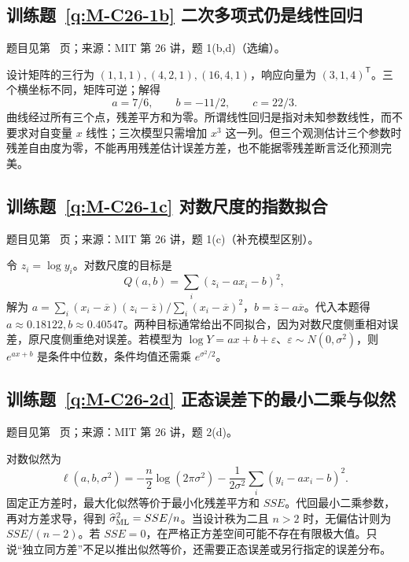 \documentclass[UTF8,12pt,a4paper,fontset=fandol]{ctexbook}
\begin{document}
\subsection*{训练题~\ref{q:M-C26-1b} 二次多项式仍是线性回归}\label{a:M-C26-1b}{\small 题目见第~\pageref{q:M-C26-1b} 页；来源：MIT 第 26 讲，题 1(b,d)（选编）。}
\begin{solve}设计矩阵的三行为 $(1,1,1),(4,2,1),(16,4,1)$，响应向量为 $(3,1,4)^\mathsf T$。三个横坐标不同，矩阵可逆；解得\[a=7/6,\qquad b=-11/2,\qquad c=22/3.\]曲线经过所有三个点，残差平方和为零。所谓线性回归是指对未知参数线性，而不要求对自变量 $x$ 线性；三次模型只需增加 $x^3$ 这一列。但三个观测估计三个参数时残差自由度为零，不能再用残差估计误差方差，也不能据零残差断言泛化预测完美。\end{solve}

\subsection*{训练题~\ref{q:M-C26-1c} 对数尺度的指数拟合}\label{a:M-C26-1c}{\small 题目见第~\pageref{q:M-C26-1c} 页；来源：MIT 第 26 讲，题 1(c)（补充模型区别）。}
\begin{solve}令 $z_i=\log y_i$。对数尺度的目标是\[Q(a,b)=\sum_i(z_i-ax_i-b)^2,\]解为 $a=\sum_i(x_i-\overline x)(z_i-\overline z)/\sum_i(x_i-\overline x)^2$，$b=\overline z-a\overline x$。代入本题得 $a\approx0.18122,b\approx0.40547$。两种目标通常给出不同拟合，因为对数尺度侧重相对误差，原尺度侧重绝对误差。若模型为 $\log Y=ax+b+\varepsilon$、$\varepsilon\sim N(0,\sigma^2)$，则 $e^{ax+b}$ 是条件中位数，条件均值还需乘 $e^{\sigma^2/2}$。\end{solve}

\subsection*{训练题~\ref{q:M-C26-2d} 正态误差下的最小二乘与似然}\label{a:M-C26-2d}{\small 题目见第~\pageref{q:M-C26-2d} 页；来源：MIT 第 26 讲，题 2(d)。}
\begin{solve}对数似然为\[\ell(a,b,\sigma^2)=-\frac n2\log(2\pi\sigma^2)-\frac{1}{2\sigma^2}\sum_i(y_i-ax_i-b)^2.\]固定正方差时，最大化似然等价于最小化残差平方和 $SSE$。代回最小二乘参数，再对方差求导，得到 $\widehat\sigma^2_{\rm ML}=SSE/n$。当设计秩为二且 $n>2$ 时，无偏估计则为 $SSE/(n-2)$。若 $SSE=0$，在严格正方差空间可能不存在有限极大值。只说“独立同方差”不足以推出似然等价，还需要正态误差或另行指定的误差分布。\end{solve}
\end{document}
